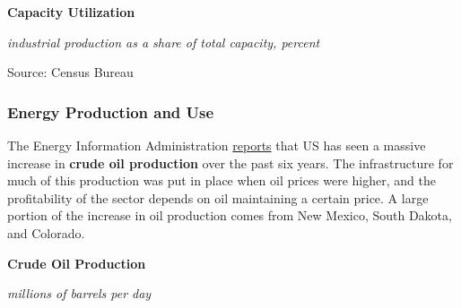 \documentclass{report}
\makeatletter
\newcommand{\tbllink}[1]{\href{https://raw.githubusercontent.com/bdecon/US-chartbook/master/chartbook/data/#1}{\faTable}}
\newcommand*\short[1]{\expandafter\@gobbletwo\number\numexpr#1\relax}
\newcommand{\stdnode}[3]{\node[below, align=left, shift=({#1,#2})]{#3};}
\newcommand{\dateaxisticks}{
		date coordinates in=x, axis line style={draw=none},
		xmax={2020-08-10},
		max space between ticks=40,	    
		xtick={{1990-01-01}, {1992-01-01}, {1994-01-01}, 
			{1996-01-01}, {1998-01-01}, {2000-01-01}, 
			{2002-01-01}, {2004-01-01}, {2006-01-01},
			{2008-01-01}, {2010-01-01}, {2012-01-01}, {2014-01-01},
		    {2016-01-01}, {2018-01-01}, {2020-01-01}},
		minor xtick={{1989-01-01}, {1991-01-01}, {1993-01-01},
			{1995-01-01}, {1997-01-01}, {1999-01-01}, 
			{2001-01-01}, {2003-01-01}, {2005-01-01}, {2007-01-01},
		    {2009-01-01}, {2011-01-01}, {2013-01-01}, {2015-01-01},
		    {2017-01-01}, {2019-01-01}},
		enlarge y limits={0.06}, enlarge x limits={0.01},
		}
\newcommand{\bbar}[2]{extra #1 ticks = {{#2}}, extra #1 tick labels = ,
		extra #1 tick style = {grid=major, grid style={thick, black!25}},}
\newcommand{\stdline}[4]{\addplot[very thick, no markers, color=#1] 
		table [x=#2, y=#3, col sep=comma] {#4};	}
\newcommand{\thickline}[4]{\addplot[ultra thick, no markers, color=#1] 
		table [x=#2, y=#3, col sep=comma] {#4};	}
\newcommand{\rbars}{
		\fill[color=black!10] (axis cs:{1990-07-01},\pgfkeysvalueof{/pgfplots/ymin}) rectangle 
			(axis cs:{1991-03-01}, \pgfkeysvalueof{/pgfplots/ymax});
		\fill[color=black!10] (axis cs:{2007-12-01},\pgfkeysvalueof{/pgfplots/ymin}) rectangle 
			(axis cs:{2009-07-01}, \pgfkeysvalueof{/pgfplots/ymax});
		\fill[color=black!10] (axis cs:{2001-03-01},\pgfkeysvalueof{/pgfplots/ymin}) rectangle 
			(axis cs:{2001-11-01}, \pgfkeysvalueof{/pgfplots/ymax});
		\fill[color=black!10] (axis cs:{2020-02-01},\pgfkeysvalueof{/pgfplots/ymin}) rectangle 
			(axis cs:{2020-09-01}, \pgfkeysvalueof{/pgfplots/ymax});}
\makeatother
\begin{document}
{{{{\begin{minipage}{0.76\textwidth}
\vspace{4mm}

\normalsize \textbf{Capacity Utilization}

\footnotesize{\textit{industrial production as a share of total capacity, percent}}

\hspace*{-2mm} 

\footnotesize{Source: Census Bureau} \hfill \tbllink{tcu.csv}

\end{minipage}

\newpage

\subsubsection*{\color{black!70} \seriffont Energy Production and Use}

\begin{minipage}{0.76\textwidth}

\small The Energy Information Administration \href{https://www.eia.gov/dnav/pet/pet_crd_crpdn_adc_mbblpd_m.htm}{reports} that US has seen a massive increase in \textbf{crude oil production} over the past six years. The infrastructure for much of this production was put in place when oil prices were higher, and the profitability of the sector depends on oil maintaining a certain price. A large portion of the increase in oil production comes from New Mexico, South Dakota, and Colorado. 

\vspace{4mm}

\normalsize \textbf{Crude Oil Production}

\footnotesize{\textit{millions of barrels per day}}


\end{minipage}}}}}
\end{document}

